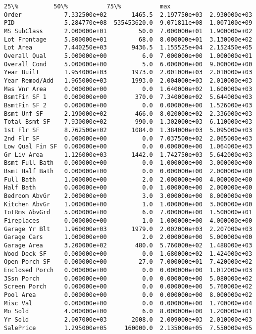 \documentclass[11pt]{article}
\begin{document}
\begin{tcolorbox}[breakable, size=fbox, boxrule=.5pt, pad at break*=1mm, opacityfill=0]
\begin{Verbatim}[commandchars=\\\{\}]
                          25\%          50\%           75\%           max
Order            7.332500e+02       1465.5  2.197750e+03  2.930000e+03
PID              5.284770e+08  535453620.0  9.071811e+08  1.007100e+09
MS SubClass      2.000000e+01         50.0  7.000000e+01  1.900000e+02
Lot Frontage     5.800000e+01         68.0  8.000000e+01  3.130000e+02
Lot Area         7.440250e+03       9436.5  1.155525e+04  2.152450e+05
Overall Qual     5.000000e+00          6.0  7.000000e+00  1.000000e+01
Overall Cond     5.000000e+00          5.0  6.000000e+00  9.000000e+00
Year Built       1.954000e+03       1973.0  2.001000e+03  2.010000e+03
Year Remod/Add   1.965000e+03       1993.0  2.004000e+03  2.010000e+03
Mas Vnr Area     0.000000e+00          0.0  1.640000e+02  1.600000e+03
BsmtFin SF 1     0.000000e+00        370.0  7.340000e+02  5.644000e+03
BsmtFin SF 2     0.000000e+00          0.0  0.000000e+00  1.526000e+03
Bsmt Unf SF      2.190000e+02        466.0  8.020000e+02  2.336000e+03
Total Bsmt SF    7.930000e+02        990.0  1.302000e+03  6.110000e+03
1st Flr SF       8.762500e+02       1084.0  1.384000e+03  5.095000e+03
2nd Flr SF       0.000000e+00          0.0  7.037500e+02  2.065000e+03
Low Qual Fin SF  0.000000e+00          0.0  0.000000e+00  1.064000e+03
Gr Liv Area      1.126000e+03       1442.0  1.742750e+03  5.642000e+03
Bsmt Full Bath   0.000000e+00          0.0  1.000000e+00  3.000000e+00
Bsmt Half Bath   0.000000e+00          0.0  0.000000e+00  2.000000e+00
Full Bath        1.000000e+00          2.0  2.000000e+00  4.000000e+00
Half Bath        0.000000e+00          0.0  1.000000e+00  2.000000e+00
Bedroom AbvGr    2.000000e+00          3.0  3.000000e+00  8.000000e+00
Kitchen AbvGr    1.000000e+00          1.0  1.000000e+00  3.000000e+00
TotRms AbvGrd    5.000000e+00          6.0  7.000000e+00  1.500000e+01
Fireplaces       0.000000e+00          1.0  1.000000e+00  4.000000e+00
Garage Yr Blt    1.960000e+03       1979.0  2.002000e+03  2.207000e+03
Garage Cars      1.000000e+00          2.0  2.000000e+00  5.000000e+00
Garage Area      3.200000e+02        480.0  5.760000e+02  1.488000e+03
Wood Deck SF     0.000000e+00          0.0  1.680000e+02  1.424000e+03
Open Porch SF    0.000000e+00         27.0  7.000000e+01  7.420000e+02
Enclosed Porch   0.000000e+00          0.0  0.000000e+00  1.012000e+03
3Ssn Porch       0.000000e+00          0.0  0.000000e+00  5.080000e+02
Screen Porch     0.000000e+00          0.0  0.000000e+00  5.760000e+02
Pool Area        0.000000e+00          0.0  0.000000e+00  8.000000e+02
Misc Val         0.000000e+00          0.0  0.000000e+00  1.700000e+04
Mo Sold          4.000000e+00          6.0  8.000000e+00  1.200000e+01
Yr Sold          2.007000e+03       2008.0  2.009000e+03  2.010000e+03
SalePrice        1.295000e+05     160000.0  2.135000e+05  7.550000e+05
\end{Verbatim}
\end{tcolorbox}
        
\end{document}
